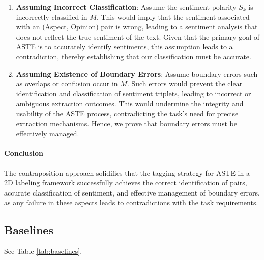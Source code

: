 \documentclass[11pt]{article}
\begin{document}
\begin{adjustwidth}{0.9em}{0pt}
\begin{enumerate}
    \item \textbf{Assuming Incorrect Classification}:
    Assume the sentiment polarity \( S_k \) is incorrectly classified in \( M \). This would imply that the sentiment associated with an (Aspect, Opinion) pair is wrong, leading to a sentiment analysis that does not reflect the true sentiment of the text. Given that the primary goal of ASTE is to accurately identify sentiments, this assumption leads to a contradiction, thereby establishing that our classification must be accurate.

    \item \textbf{Assuming Existence of Boundary Errors}:
    Assume boundary errors such as overlaps or confusion occur in \( M \). Such errors would prevent the clear identification and classification of sentiment triplets, leading to incorrect or ambiguous extraction outcomes. This would undermine the integrity and usability of the ASTE process, contradicting the task's need for precise extraction mechanisms. Hence, we prove that boundary errors must be effectively managed.
\end{enumerate}

\paragraph{Conclusion}
The contraposition approach solidifies that the tagging strategy for ASTE in a 2D labeling framework successfully achieves the correct identification of pairs, accurate classification of sentiment, and effective management of boundary errors, as any failure in these aspects leads to contradictions with the task requirements.

\end{adjustwidth}



\subsection{Baselines}
\label{sec:Baseline}
See Table \ref{tab:baselines}. 
\end{document}
